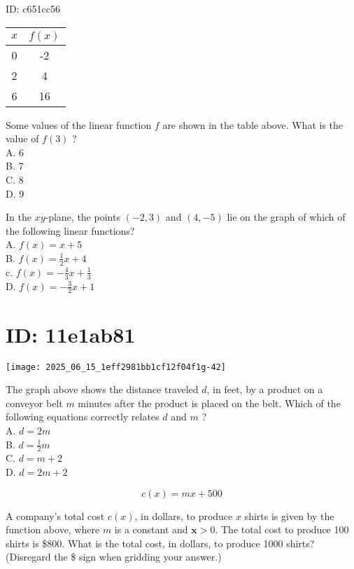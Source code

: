 ID: c651cc56

\begin{center}
\begin{tabular}{|c|c|}
\hline
$x$ & $f(x)$ \\
\hline
0 & -2 \\
\hline
2 & 4 \\
\hline
6 & 16 \\
\hline
\end{tabular}
\end{center}

Some values of the linear function $f$ are shown in the table above. What is the value of $f(3)$ ?\\
A. 6\\
B. 7\\
C. 8\\
D. 9

In the $x y$-plane, the points $(-2,3)$ and $(4,-5)$ lie on the graph of which of the following linear functions?\\
A. $f(x)=x+5$\\
B. $f(x)=\frac{1}{2} x+4$\\
c. $f(x)=-\frac{4}{3} x+\frac{1}{3}$\\
D. $f(x)=-\frac{3}{2} x+1$

\section*{ID: 11e1ab81}
\begin{center}
\texttt{[image: 2025\_06\_15\_1eff2981bb1cf12f04f1g-42]}
\end{center}

The graph above shows the distance traveled $d$, in feet, by a product on a conveyor belt $m$ minutes after the product is placed on the belt. Which of the following equations correctly relates $d$ and $m$ ?\\
A. $d=2 m$\\
B. $d=\frac{1}{2} m$\\
C. $d=m+2$\\
D. $d=2 m+2$

$$
c(x)=m x+500
$$

A company's total cost $c(x)$, in dollars, to produce $x$ shirts is given by the function above, where $m$ is a constant and $\boldsymbol{x}>0$. The total cost to produce 100 shirts is \$800. What is the total cost, in dollars, to produce 1000 shirts? (Disregard the \$ sign when gridding your answer.)

